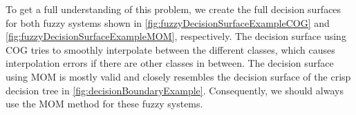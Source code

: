 To get a full understanding of this problem, we create the full decision surfaces for both fuzzy systems shown in \autoref{fig:fuzzyDecisionSurfaceExampleCOG} and \autoref{fig:fuzzyDecisionSurfaceExampleMOM}, respectively. The decision surface using COG tries to smoothly interpolate between the different classes, which causes interpolation errors if there are other classes in between. The decision surface using MOM is mostly valid and closely resembles the decision surface of the crisp decision tree in \autoref{fig:decisionBoundaryExample}. Consequently, we should always use the MOM method for these fuzzy systems.

\begin{figure}[H]
    \centering
    \begin{subfigure}[t]{0.45\textwidth}
        \centering
\end{subfigure}
\end{figure}
